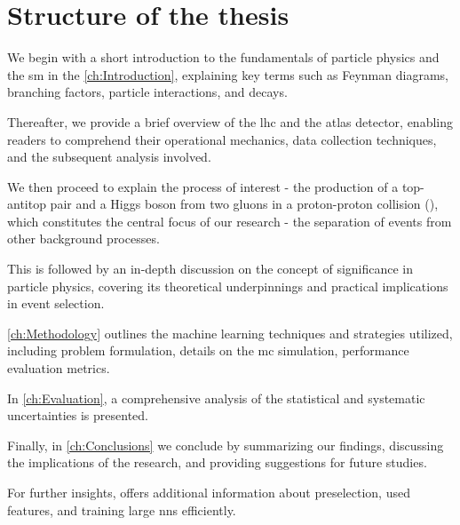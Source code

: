 \chapter*{Structure of the thesis}

We begin with a short introduction to the fundamentals of particle physics and the \gls{sm} in the
\autoref{ch:Introduction}, explaining key terms such as Feynman diagrams, branching factors, particle
interactions, and decays.

Thereafter, we provide a brief overview of the \gls{lhc} and the \gls{atlas} detector, enabling readers to comprehend
their operational mechanics, data collection techniques, and the subsequent analysis involved.

We then proceed to explain the process of interest - the production of a top-antitop pair and a Higgs boson from two
gluons in a proton-proton collision (\tth), which constitutes the central focus of our research - the separation of \tth
events from other background processes.

This is followed by an in-depth discussion on the concept of significance in particle physics, covering its theoretical
underpinnings and practical implications in event selection.

\autoref{ch:Methodology} outlines the machine learning techniques and strategies utilized, including
problem formulation, details on the \gls{mc} simulation, performance evaluation metrics.

In \autoref{ch:Evaluation}, a comprehensive analysis of the statistical and systematic uncertainties is
presented.

Finally, in \autoref{ch:Conclusions} we conclude by summarizing our findings, discussing the implications
of the research, and providing suggestions for future studies.

For further insights, \textbf{} offers additional information about preselection, used features,
and training large \glspl{nn} efficiently.